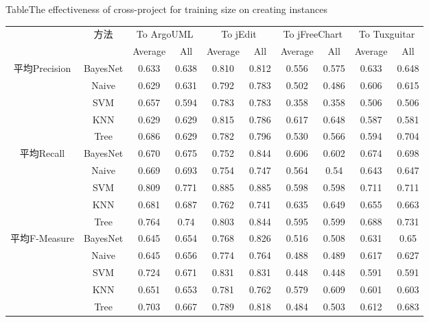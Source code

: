 \begin{table} [htbp]
{Table$\!$}{The effectiveness of cross-project for training size on creating instances}
\vspace{0.5em}
\centering
\footnotesize
\begin{tabular}{cccccccccc}
\toprule[1.5pt]
~\multirow{2}{*}{指标}&\multirow{2}{*}{方法}&\multicolumn{2}{c}{To ArgoUML}&\multicolumn{2}{c}{To jEdit}&\multicolumn{2}{c}{To jFreeChart}&\multicolumn{2}{c}{To  Tuxguitar}\\
\cline{3-10}
~&~&{Average}&{All}&{Average}&{All}&{Average}&{All}&{Average}&{All}\\
\midrule[1pt]
\multirow{5}{*}{平均Precision}
&BayesNet&0.633&0.638&0.810&	0.812&0.556&0.575&0.633&0.648\\
&Naive&0.629&0.631&0.792&0.783&0.502&0.486&	0.606&0.615\\
&SVM&0.657&0.594&0.783&0.783&	0.358&0.358&0.506&	0.506\\
&KNN&0.629&0.629&0.815&0.786&	0.617&0.648&0.587&	0.581\\
&Tree&0.686&	0.629&0.782&0.796&	0.530&0.566&0.594&0.704\\
\hline
\multirow{5}{*}{平均Recall}															
&BayesNet&0.670&0.675&	0.752&0.844&	0.606&0.602&	0.674&0.698\\
&Naive&0.669&0.693&	0.754&0.747&	0.564&0.54&0.643&0.647\\
&SVM&	0.809&0.771&0.885&	0.885&0.598&0.598&0.711&0.711\\
&KNN&	0.681&0.687&0.762&0.741&0.635&0.649&0.655&	0.663\\
&Tree	&0.764&	0.74&	0.803&0.844&0.595&	0.599&0.688&0.731\\
\hline
\multirow{5}{*}{平均F-Measure}					
&BayesNet&0.645&0.654&	0.768&0.826&0.516&0.508&0.631&0.65\\
&Naive&0.645&0.656&	0.774&0.764	&0.488&	0.489	&0.617&0.627\\
&SVM&	0.724&0.671&0.831&	0.831&0.448&0.448&	0.591&0.591\\
&KNN&	0.651&0.653&0.781&	0.762&0.579	&0.609&	0.601	&0.603\\
&Tree	&0.703&	0.667&0.789&0.818&	0.484	&0.503&	0.612	&0.683\\
\bottomrule[1.5pt]
\end{tabular}
\end{table}

